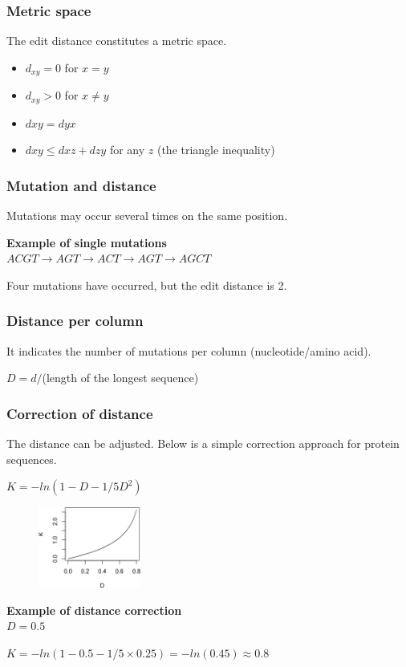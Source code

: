 %
%
\subsubsection*{Metric space}
The edit distance constitutes a metric space.
\begin{itemize}
\item $d_{xy} = 0$ for $x = y$ 
\item $d_{xy} > 0$ for $x \neq y$
\item $dxy = dyx$
\item $dxy \leq dxz + dzy$ for any $z$ (the triangle inequality)
\end{itemize}

%
%
\subsubsection*{Mutation and distance}
Mutations may occur several times on the same position.

\medskip 
\noindent
\textbf{Example of single mutations} \\

\noindent
$ACGT \rightarrow AGT \rightarrow ACT \rightarrow AGT \rightarrow AGCT$

\medskip 
\noindent
Four mutations have occurred, but the edit distance is 2.

%
%
\subsubsection*{Distance per column}
It indicates the number of mutations per column (nucleotide/amino acid).

\bigskip 
$D = d / $(length of the longest sequence)

%
%
\subsubsection*{Correction of distance}
The distance can be adjusted. Below is a simple correction approach for protein sequences.

\bigskip 
$K=-ln⁡(1-D-1/5 D^2 )$
\begin{figure}[H]
  \centering
      \includegraphics[width=0.3\textwidth]{fig03/adjust_distance.png}
\end{figure}

\medskip 
\noindent
\textbf{Example of distance correction} \\

$D = 0.5$

$K = -ln⁡(1 - 0.5 - 1/5  \times 0.25 ) = -ln(0.45) \approx 0.8⁡$

%

